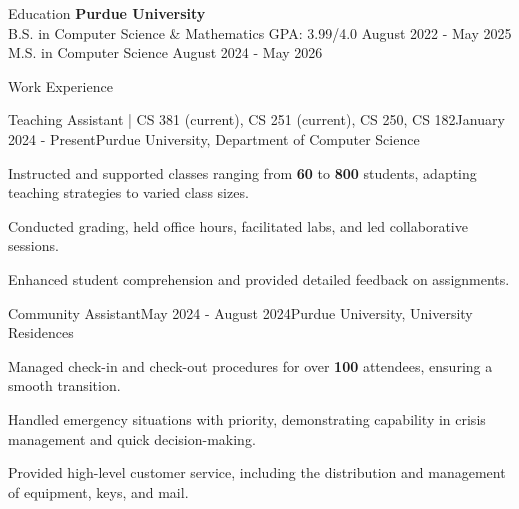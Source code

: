 \documentclass[
    11pt, %
]{resume} %
\begin{document}
\small

\vspace*{-0.3cm}
\begin{rSection}{Education}
\vspace*{-0.3cm}
    \textbf{Purdue University} \\
    B.S. in Computer Science \& Mathematics \hfill GPA: 3.99/4.0 \quad August 2022 - May 2025 \\
    M.S. in Computer Science \hfill August 2024 - May 2026 \\
\end{rSection}
\vspace*{-0.3cm}
\begin{rSection}{Work Experience}
\vspace*{-0.2cm}
    \begin{rSubsection}{Teaching Assistant | CS 381 (current), CS 251 (current), CS 250, CS 182}{January 2024 - Present}{Purdue University, Department of Computer Science}{}
        \item Instructed and supported classes ranging from \textbf{60} to \textbf{800} students, adapting teaching strategies to varied class sizes.
        \item Conducted grading, held office hours, facilitated labs, and led collaborative sessions.
        \item Enhanced student comprehension and provided detailed feedback on assignments.
    \end{rSubsection}
    \vspace*{0,3cm}
    
\begin{rSubsection}{Community Assistant}{May 2024 - August 2024}{Purdue University, University Residences}{}
    \item Managed check-in and check-out procedures for over \textbf{100} attendees, ensuring a smooth transition.
    \item Handled emergency situations with priority, demonstrating capability in crisis management and quick decision-making.
    \item Provided high-level customer service, including the distribution and management of equipment, keys, and mail.
\end{rSubsection}

\end{rSection}
\end{document}
